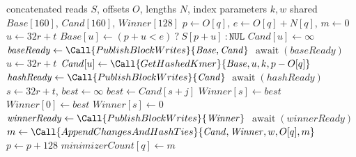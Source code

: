\begin{algorithm}[H]
\caption{G3SA sketching CUDA algorithm}
\label{alg:g3sa-sketch-kernel}
\footnotesize
\begin{algorithmic}[1]
  \Require concatenated reads $S$, offsets $O$, lengths $N$, index parameters
           $k,w$
  \State shared $\mathit{Base}[160]$, $\mathit{Cand}[160]$,
         $\mathit{Winner}[128]$
    \Comment{$b$ is a block; $t\in[0,32)$ is its thread}
      \State $p\gets O[q]$, $e\gets O[q]+N[q]$, $m\gets0$
          \State $u\gets32r+t$
          \State $\mathit{Base}[u]\gets
                 (p+u<e)\ ?\ S[p+u]\ :\mathtt{NUL}$
          \State $\mathit{Cand}[u]\gets\infty$
        \EndFor
        \State $\mathit{baseReady}\gets
               \Call{PublishBlockWrites}{\mathit{Base},\mathit{Cand}}$
        \State $\operatorname{await}(\mathit{baseReady})$
          \State $u\gets32r+t$
          \State $\mathit{Cand}[u]\gets
                 \Call{GetHashedKmer}{\mathit{Base},u,k,p-O[q]}$
        \EndFor
        \State $\mathit{hashReady}\gets
               \Call{PublishBlockWrites}{\mathit{Cand}}$
        \State $\operatorname{await}(\mathit{hashReady})$
          \State $s\gets32r+t$, $\mathit{best}\gets\infty$
              \State $\mathit{best}\gets\mathit{Cand}[s+j]$
            \EndIf
          \EndFor
            \State $\mathit{Winner}[s]\gets\mathit{best}$
            \State $\mathit{Winner}[0]\gets\mathit{best}$
          \Else
            \State $\mathit{Winner}[s]\gets0$
          \EndIf
        \EndFor
        \State $\mathit{winnerReady}\gets
               \Call{PublishBlockWrites}{\mathit{Winner}}$
        \State $\operatorname{await}(\mathit{winnerReady})$
          \State $m\gets\Call{AppendChangesAndHashTies}
                    {\mathit{Cand},\mathit{Winner},w,O[q],m}$
        \EndIf
        \State $p\gets p+128$
      \EndWhile
        \State $\mathit{minimizerCount}[q]\gets m$
      \EndIf
    \EndFor
  \EndProcedure
\end{algorithmic}
\end{algorithm}


